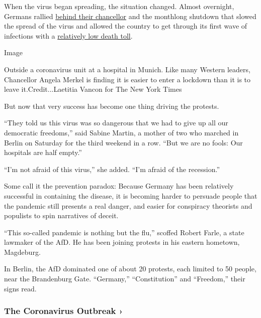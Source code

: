 When the virus began spreading, the situation changed. Almost overnight,
Germans rallied
\href{https://www.nytimes.com/2020/03/11/world/europe/coronavirus-merkel-germany.html?action=click\&module=RelatedLinks\&pgtype=Article}{behind
their chancellor} and the monthlong shutdown that slowed the spread of
the virus and allowed the country to get through its first wave of
infections with a
\href{https://www.nytimes.com/2020/04/04/world/europe/germany-coronavirus-death-rate.html}{relatively
low death toll}.

Image

Outside a coronavirus unit at a hospital in Munich. Like many Western
leaders, Chancellor Angela Merkel is finding it is easier to enter a
lockdown than it is to leave it.Credit...Laetitia Vancon for The New
York Times

But now that very success has become one thing driving the protests.

``They told us this virus was so dangerous that we had to give up all
our democratic freedoms,'' said Sabine Martin, a mother of two who
marched in Berlin on Saturday for the third weekend in a row. ``But we
are no fools: Our hospitals are half empty.''

``I'm not afraid of this virus,'' she added. ``I'm afraid of the
recession.''

Some call it the prevention paradox: Because Germany has been relatively
successful in containing the disease, it is becoming harder to persuade
people that the pandemic still presents a real danger, and easier for
conspiracy theorists and populists to spin narratives of deceit.

``This so-called pandemic is nothing but the flu,'' scoffed Robert
Farle, a state lawmaker of the AfD. He has been joining protests in his
eastern hometown, Magdeburg.

In Berlin, the AfD dominated one of about 20 protests, each limited to
50 people, near the Brandenburg Gate. ``Germany,'' ``Constitution'' and
``Freedom,'' their signs read.

\href{https://www.nytimes.com/news-event/coronavirus?action=click\&pgtype=Article\&state=default\&region=MAIN_CONTENT_3\&context=storylines_faq}{}

\hypertarget{the-coronavirus-outbreak-}{%
\subsubsection{The Coronavirus Outbreak
›}\label{the-coronavirus-outbreak-}}

